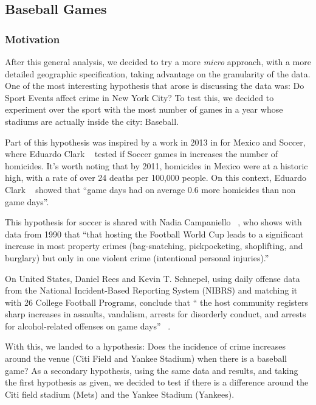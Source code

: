 \documentclass{article}
\begin{document}
\pagebreak
\subsection{Baseball Games}
\subsubsection{Motivation}
After this general analysis, we decided to try a more \textit{micro} approach, with a more detailed geographic specification, taking advantage on the granularity of the data. One of the most interesting hypothesis that arose is discussing the data was: Do Sport Events affect crime in New York City? To test this, we decided to experiment over the sport with the most number of games in a year whose stadiums are actually inside the city: Baseball. 

Part of this hypothesis was inspired by a work in 2013 in for Mexico and Soccer, where Eduardo Clark ~\autocite{Clark} tested if Soccer games in increases the number of homicides. It's worth noting that by 2011, homicides in Mexico were at a historic high, with a rate of over 24 deaths per 100,000 people. On this context, Eduardo Clark ~\autocite{Clark} showed that ``game days had on average 0.6 more homicides than non game days''. 

This hypothesis for soccer is shared with Nadia Campaniello ~\autocite{Campaniello}, who shows with data from 1990 that ``that hosting the Football World Cup leads to a significant increase in most property crimes (bag-snatching, pickpocketing, shoplifting, and burglary) but only in one violent crime (intentional personal injuries).'' ~\autocite{Campaniello}

On United States, Daniel Rees and Kevin T. Schnepel, using daily offense data from the National Incident-Based Reporting System (NIBRS)  and matching it with 26 College Football Programs, conclude that `` the host community registers sharp increases in assaults, vandalism, arrests for disorderly conduct, and arrests for alcohol-related offenses on game days'' ~\autocite{Rees_Schnepel}.

With this, we landed to a hypothesis: Does the incidence of crime increases around the venue (Citi Field and Yankee Stadium) when there is a baseball game? As a secondary hypothesis, using the same data and results, and taking the first hypothesis as given, we decided to test if there is a difference around the Citi field stadium (Mets) and the Yankee Stadium (Yankees). 
\end{document}
